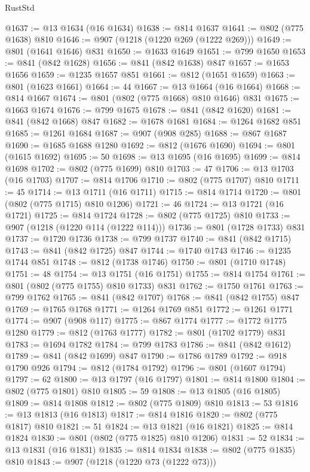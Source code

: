 \begin{lexlean}{RustStd}
\begin{coremodule}
@1637 := @13 @1634 (@16 @1634)
@1638 := @814 @1637
@1641 := @802 (@775 @1638) @810
@1646 := @907 (@1218 (@1220 @269 (@1222 @269)))
@1649 := @801 (@1641 @1646) @831
@1650 := @1633 @1649
@1651 := @799 @1650
@1653 := @841 (@842 @1628)
@1656 := @841 (@842 @1638) @847
@1657 := @1653 @1656
@1659 := @1235 @1657 @851
@1661 := @812 (@1651 @1659)
@1663 := @801 (@1623 @1661)
@1664 := 44
@1667 := @13 @1664 (@16 @1664)
@1668 := @814 @1667
@1674 := @801 (@802 (@775 @1668) @810 @1646) @831
@1675 := @1663 @1674
@1676 := @799 @1675
@1678 := @841 (@842 @1620)
@1681 := @841 (@842 @1668) @847
@1682 := @1678 @1681
@1684 := @1264 @1682 @851
@1685 := @1261 @1684
@1687 := @907 (@908 @285)
@1688 := @867 @1687
@1690 := @1685 @1688 @1280
@1692 := @812 (@1676 @1690)
@1694 := @801 (@1615 @1692)
@1695 := 50
@1698 := @13 @1695 (@16 @1695)
@1699 := @814 @1698
@1702 := @802 (@775 @1699) @810
@1703 := 47
@1706 := @13 @1703 (@16 @1703)
@1707 := @814 @1706
@1710 := @802 (@775 @1707) @810
@1711 := 45
@1714 := @13 @1711 (@16 @1711)
@1715 := @814 @1714
@1720 := @801 (@802 (@775 @1715) @810 @1206)
@1721 := 46
@1724 := @13 @1721 (@16 @1721)
@1725 := @814 @1724
@1728 := @802 (@775 @1725) @810
@1733 := @907 (@1218 (@1220 @114 (@1222 @114)))
@1736 := @801 (@1728 @1733) @831
@1737 := @1720 @1736
@1738 := @799 @1737
@1740 := @841 (@842 @1715)
@1743 := @841 (@842 @1725) @847
@1744 := @1740 @1743
@1746 := @1235 @1744 @851
@1748 := @812 (@1738 @1746)
@1750 := @801 (@1710 @1748)
@1751 := 48
@1754 := @13 @1751 (@16 @1751)
@1755 := @814 @1754
@1761 := @801 (@802 (@775 @1755) @810 @1733) @831
@1762 := @1750 @1761
@1763 := @799 @1762
@1765 := @841 (@842 @1707)
@1768 := @841 (@842 @1755) @847
@1769 := @1765 @1768
@1771 := @1264 @1769 @851
@1772 := @1261 @1771
@1774 := @907 (@908 @117)
@1775 := @867 @1774
@1777 := @1772 @1775 @1280
@1779 := @812 (@1763 @1777)
@1782 := @801 (@1702 @1779) @831
@1783 := @1694 @1782
@1784 := @799 @1783
@1786 := @841 (@842 @1612)
@1789 := @841 (@842 @1699) @847
@1790 := @1786 @1789
@1792 := @918 @1790 @926
@1794 := @812 (@1784 @1792)
@1796 := @801 (@1607 @1794)
@1797 := 62
@1800 := @13 @1797 (@16 @1797)
@1801 := @814 @1800
@1804 := @802 (@775 @1801) @810
@1805 := 59
@1808 := @13 @1805 (@16 @1805)
@1809 := @814 @1808
@1812 := @802 (@775 @1809) @810
@1813 := 53
@1816 := @13 @1813 (@16 @1813)
@1817 := @814 @1816
@1820 := @802 (@775 @1817) @810
@1821 := 51
@1824 := @13 @1821 (@16 @1821)
@1825 := @814 @1824
@1830 := @801 (@802 (@775 @1825) @810 @1206)
@1831 := 52
@1834 := @13 @1831 (@16 @1831)
@1835 := @814 @1834
@1838 := @802 (@775 @1835) @810
@1843 := @907 (@1218 (@1220 @73 (@1222 @73)))

\end{coremodule}
\end{lexlean}
